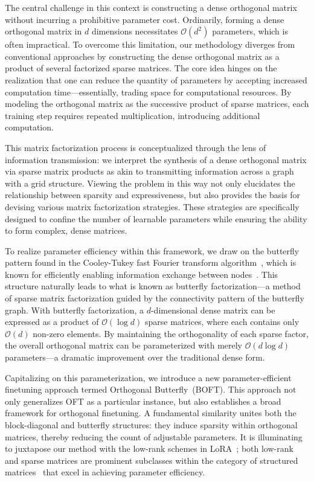 The central challenge in this context is constructing a dense orthogonal matrix without incurring a prohibitive parameter cost. Ordinarily, forming a dense orthogonal matrix in $d$ dimensions necessitates $\mathcal{O}(d^2)$ parameters, which is often impractical. To overcome this limitation, our methodology diverges from conventional approaches by constructing the dense orthogonal matrix as a product of several factorized sparse matrices. The core idea hinges on the realization that one can reduce the quantity of parameters by accepting increased computation time—essentially, trading space for computational resources. By modeling the orthogonal matrix as the successive product of sparse matrices, each training step requires repeated multiplication, introducing additional computation. 

This matrix factorization process is conceptualized through the lens of information transmission: we interpret the synthesis of a dense orthogonal matrix via sparse matrix products as akin to transmitting information across a graph with a grid structure. Viewing the problem in this way not only elucidates the relationship between sparsity and expressiveness, but also provides the basis for devising various matrix factorization strategies. These strategies are specifically designed to confine the number of learnable parameters while ensuring the ability to form complex, dense matrices.

To realize parameter efficiency within this framework, we draw on the butterfly pattern found in the Cooley-Tukey fast Fourier transform algorithm~\cite{cooley1965algorithm}, which is known for efficiently enabling information exchange between nodes~\cite{klasing1994broadcasting}. This structure naturally leads to what is known as butterfly factorization—a method of sparse matrix factorization guided by the connectivity pattern of the butterfly graph. With butterfly factorization, a $d$-dimensional dense matrix can be expressed as a product of $\mathcal{O}(\log d)$ sparse matrices, where each contains only $\mathcal{O}(d)$ non-zero elements. By maintaining the orthogonality of each sparse factor, the overall orthogonal matrix can be parameterized with merely $\mathcal{O}(d\log d)$ parameters—a dramatic improvement over the traditional dense form. 

Capitalizing on this parameterization, we introduce a new parameter-efficient finetuning approach termed Orthogonal Butterfly~(BOFT). This approach not only generalizes OFT as a particular instance, but also establishes a broad framework for orthogonal finetuning. A fundamental similarity unites both the block-diagonal and butterfly structures: they induce sparsity within orthogonal matrices, thereby reducing the count of adjustable parameters. It is illuminating to juxtapose our method with the low-rank schemes in LoRA~\cite{hulora2022}; both low-rank and sparse matrices are prominent subclasses within the category of structured matrices~\cite{candes2011robust} that excel in achieving parameter efficiency.

